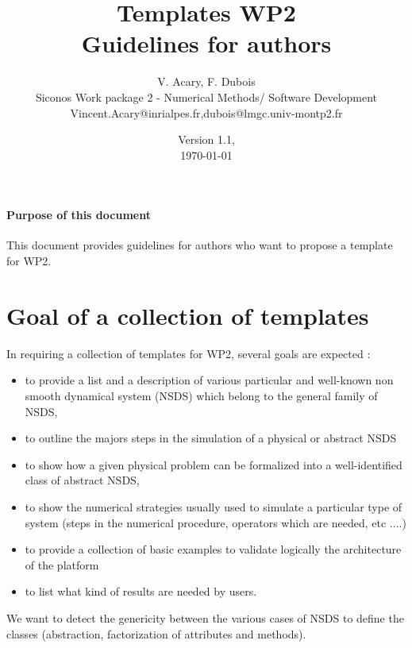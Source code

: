 \documentclass[10pt]{article}
\begin{document}
\pagestyle{fancy}
\thispagestyle{empty}
\title{ Templates WP2 \\
  Guidelines for authors}
\author{V. Acary, F. Dubois \\[0.5cm]
 Siconos Work package 2 -  
  Numerical Methods/
    Software Development \\
Vincent.Acary@inrialpes.fr,dubois@lmgc.univ-montp2.fr}

\date{Version 1.1, \\
\today}
\maketitle

\paragraph{Purpose of this document} This document provides guidelines for authors who want to propose a template for WP2.

\section{Goal of a collection of templates}



In requiring a collection of templates for WP2, several goals are expected :
\begin{itemize}
\item to provide a list and a description of various particular  and well-known non smooth dynamical system (NSDS) which belong to the general family of NSDS,
\item to outline the majors steps in the simulation of a physical or abstract NSDS
\item to show how a given physical problem can be formalized into a  well-identified class of abstract NSDS,

\item to show the numerical strategies usually used to simulate a particular type of system (steps in the numerical procedure, operators which are needed, etc ....)
\item to provide a collection of basic examples to validate logically the architecture of the platform
\item to list what kind of results are needed by users.
\end{itemize}


We want to detect the genericity between the various cases of NSDS to define the classes (abstraction, factorization of attributes and  methods). 
\end{document}
